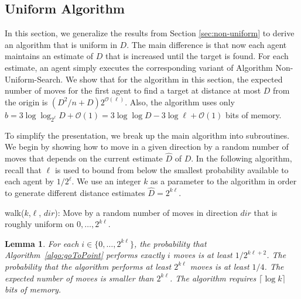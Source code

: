 \documentclass[11pt]{article}
\newtheorem{lemma}[theorem]{Lemma}
\newcommand{\BO}{\mathcal{O}}
\begin{document}
\subsection{Uniform Algorithm}
\label{sec:uniform}

In this section, we generalize the results from Section \ref{sec:non-uniform} to derive an algorithm that is uniform in $D$. The main difference is that now each agent maintains an estimate of $D$ that is increased until the target is found. For each estimate, an agent simply executes the corresponding variant of Algorithm Non-Uniform-Search. We show that for the algorithm in this section, the expected number of moves for the first agent to find a target at distance at most $D$ from the origin is $(D^2/n + D) 2^{\BO(\ell)}$. Also, the algorithm uses only $b = 3 \log \log_{2^\ell} D +\BO(1) = 3 \log \log D - 3 \log \ell + \BO(1)$ bits of memory.

To simplify the presentation, we break up the main algorithm into subroutines. We begin by showing how to move in a given direction by a random number of moves that depends on the current estimate $\hat{D}$ of $D$. In the following algorithm, recall that $\ell$ is used to bound from below the smallest probability available to each agent by $1/2^{\ell}$. We use an integer $k$ as a parameter to the algorithm in order to generate different distance estimates $\hat{D} = 2^{k \ell}$.

\begin{algorithm}
\caption{walk($k$,$\ell$, $dir$): Move by a random number of moves in direction $dir$ that is roughly uniform on $0,\ldots,2^{k\ell}$.}
\label{algo:goToPoint}
\end{algorithm}


\begin{lemma}
\label{lem:walk}
	For each $i\in \{0,\ldots,2^{k\ell}\}$, the probability that Algorithm~\ref{algo:goToPoint} performs exactly $i$ moves is at least $1/2^{k\ell+2}$. The probability that the algorithm performs at least $2^{k\ell}$ moves is at least $1/4$. The expected number of moves is smaller than $2^{k\ell}$. The algorithm requires $\lceil \log k\rceil$ bits of memory.  
\end{lemma}
\end{document}
